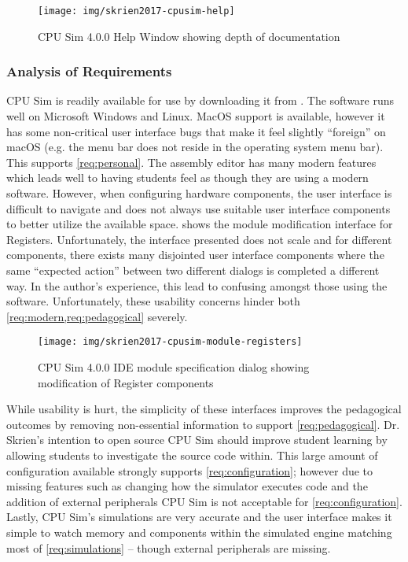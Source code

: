 \begin{figure}[b!]
    \centering
    \texttt{[image: img/skrien2017-cpusim-help]}
    \caption{CPU Sim 4.0.0 Help Window showing depth of documentation\cite{Skrien2017}}
    \label{fig:skrien2017-cpusim-help}
\end{figure}


\subsubsection*{Analysis of Requirements}

CPU Sim is readily available for use by downloading it from \cite{Skrien2017}. The software runs well on Microsoft Windows and Linux. MacOS support is available, however it has some non-critical user interface bugs that make it feel slightly ``foreign'' on macOS (e.g. the menu bar does not reside in the operating system menu bar). This supports \cref{req:personal}. The assembly editor has many modern features which leads well to having students feel as though they are using a modern software. However, when configuring hardware components, the user interface is difficult to navigate and does not always use suitable user interface components to better utilize the available space.  shows the module modification interface for Registers. Unfortunately, the interface presented does not scale and for different components, there exists many disjointed user interface components where the same ``expected action'' between two different dialogs is completed a different way. In the author's experience, this lead to confusing amongst those using the software. Unfortunately, these usability concerns hinder both \cref{req:modern,req:pedagogical} severely. 

\begin{figure}[h]
    \centering
    \texttt{[image: img/skrien2017-cpusim-module-registers]}
    \caption{CPU Sim 4.0.0 IDE module specification dialog showing modification of Register components\cite{Skrien2017}}
    \label{fig:skrien2017-cpusim-module-registers}
\end{figure}

While usability is hurt, the simplicity of these interfaces improves the pedagogical outcomes by removing non-essential information to support \cref{req:pedagogical}. Dr. Skrien's intention to open source CPU Sim should improve student learning by allowing students to investigate the source code within\cite{Skrien2016,Coppola2004,Koohang2005}. This large amount of configuration available strongly supports \cref{req:configuration}; however due to missing features such as changing how the simulator executes code and the addition of external peripherals CPU Sim is not acceptable for \cref{req:configuration}. Lastly, CPU Sim's simulations are very accurate and the user interface makes it simple to watch memory and components within the simulated engine matching most of \cref{req:simulations} -- though external peripherals are missing.

